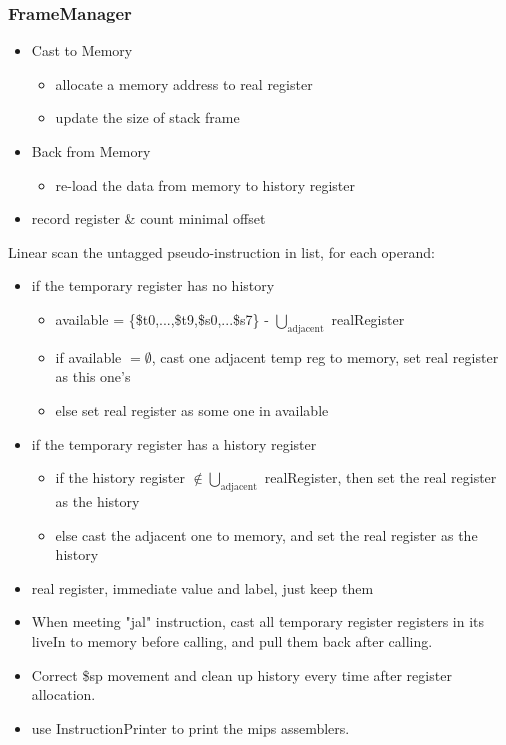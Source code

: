 \documentclass{beamer}
\begin{document}
\begin{frame}\frametitle{FrameManager}
	\begin{itemize}
		\item Cast to Memory
			\begin{itemize}
				\item allocate a memory address to real register
				\item update the size of stack frame
			\end{itemize}
		\item Back from Memory
			\begin{itemize}
				\item re-load the data from memory to history register
			\end{itemize}
		\item record register \& count minimal offset
	\end{itemize}
\end{frame}

\begin{frame}
	Linear scan the untagged pseudo-instruction in list, for each operand:
	\begin{itemize}
		\item if the temporary register has no history
			\begin{itemize}
				\item available = \{\$t0,...,\$t9,\$s0,...\$s7\} - $\bigcup_{\text{adjacent}}$ realRegister
				\item if available $ = \emptyset$, cast one adjacent temp reg to memory, set real register as this one's
				\item else set real register as some one in available
			\end{itemize}
		\item if the temporary register has a history register
			\begin{itemize}
				\item if the history register $\notin \bigcup_{\text{adjacent}}$ realRegister, then set the real register as the history
				\item else cast the adjacent one to memory, and set the real register as the history
			\end{itemize}
		\item real register, immediate value and label, just keep them
	\end{itemize}
\end{frame}

\begin{frame}
	\begin{itemize}
		\item When meeting "jal" instruction, cast all temporary register registers in its liveIn to memory before calling, and pull them back after calling. 
		\item Correct \$sp movement and clean up history every time after register allocation.
		\item use InstructionPrinter to print the mips assemblers.
	\end{itemize}
\end{frame}
\end{document}

